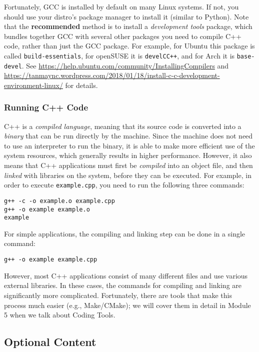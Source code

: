 \documentclass[12pt]{article}
\begin{document}
Fortunately, GCC is installed by default on many Linux systems.
If not, you should use your distro's package manager to install it (similar to Python).
Note that the \textbf{recommended} method is to install a \emph{development tools} package, which bundles together GCC with several other packages you need to compile C++ code, rather than just the GCC package.
For example, for Ubuntu this package is called \texttt{build-essentials}, for openSUSE it is \texttt{devel\ttul C\ttul C++}, and for Arch it is \texttt{base-devel}.
See \url{https://help.ubuntu.com/community/InstallingCompilers} and \url{https://tanmaync.wordpress.com/2018/01/18/install-c-c-development-environment-linux/} for details.

\subsubsection{Running C++ Code}
C++ is a \emph{compiled language}, meaning that its source code is converted into a \emph{binary} that can be run directly by the machine.
Since the machine does not need to use an interpreter to run the binary, it is able to make more efficient use of the system resources, which generally results in higher performance.
However, it also means that C++ applications must first be \emph{compiled} into an object file, and then \emph{linked} with libraries on the system, before they can be executed.
For example, in order to execute \texttt{example.cpp}, you need to run the following three commands:
\begin{verbatim}
g++ -c -o example.o example.cpp
g++ -o example example.o
example
\end{verbatim}
For simple applications, the compiling and linking step can be done in a single command:
\begin{verbatim}
g++ -o example example.cpp
\end{verbatim}
However, most C++ applications consist of many different files and use various external libraries.
In these cases, the commands for compiling and linking are significantly more complicated.
Fortunately, there are tools that make this process much easier (e.g., Make/CMake); we will cover them in detail in Module 5 when we talk about Coding Tools.



\subsection{Optional Content}
\end{document}

